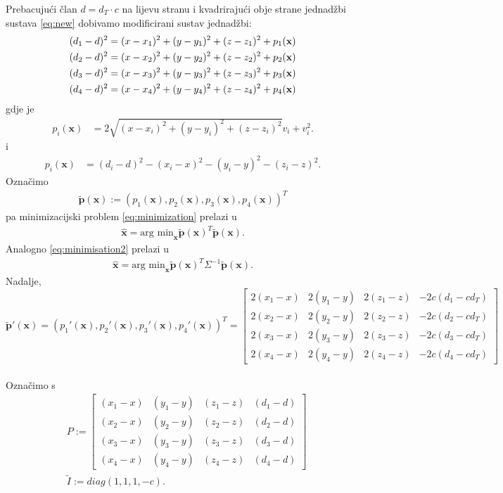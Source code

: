 \documentclass[a4paper,twoside,12pt]{memoir} %
\begin{document}
Prebacujući član $d=d_T \cdot c$ na lijevu stranu i kvadrirajući obje strane
jednadžbi sustava \ref{eq:new} dobivamo modificirani sustav jednadžbi:
\begin{align}\label{eq:newIzvedba}
(d_1-d)^2 = (x-x_1)^{2}+(y-y_1)^{2}+(z-z_1)^{2} + p_1(\textbf{x})\notag \\
(d_2-d)^2 = (x-x_2)^{2}+(y-y_2)^{2}+(z-z_2)^{2} + p_2(\textbf{x})\\
(d_3-d)^2 = (x-x_3)^{2}+(y-y_3)^{2}+(z-z_3)^{2} + p_3(\textbf{x})\notag \\
(d_4-d)^2 = (x-x_4)^{2}+(y-y_4)^{2}+(z-z_4)^{2} + p_4(\textbf{x})\notag
\end{align}
gdje je 
\begin{align*}
p_i(\textbf{x}) & = 2\sqrt{(x-x_i)^{2}+(y-y_i)^{2}+(z-z_i)^{2}}v_i + v_i^2.
\end{align*} i
\begin{align*}
p_i(\textbf{x}) & = (d_i-d)^2 - (x_i-x)^{2} - (y_i-y)^{2} - (z_i-z)^{2}.
\end{align*}
Označimo 
\begin{align*} \mathbf{\tilde{p}}(\mathbf{x}) := (p_1(\textbf{x}),p_2(\textbf{x}),p_3(\textbf{x}),p_4(\textbf{x}))^T
\end{align*}
pa minimizacijski problem \ref{eq:minimization} prelazi u
\begin{align}\label{eq:minimisation3}
\hat{\mathbf{x}} = \text{arg min}_\mathbf{x} \mathbf{\tilde{p}}(\mathbf{x})^T\mathbf{\tilde{p}}(\mathbf{x}).
\end{align}
Analogno \ref{eq:minimisation2} prelazi u 
\begin{align}\label{eq:minimisation4}
\hat{\mathbf{x}} = \text{arg min}_\mathbf{x} \mathbf{\tilde{p}}(\mathbf{x})^T \Sigma ^{-1}\mathbf{\tilde{p}}(\mathbf{x}).
\end{align}
\vspace{0.5cm}
Nadalje, $$ \mathbf{\tilde{p}'}(\mathbf{x}) = (p_1'(\textbf{x}),p_2'(\textbf{x}),p_3'(\textbf{x}),p_4'(\textbf{x}))^T 
= \begin{bmatrix}
2(x_1-x) &  2(y_1-y) &  2(z_1-z) & - 2c(d_1-cd_T)\\
2(x_2-x) &  2(y_2-y) &  2(z_2-z) & - 2c(d_2-cd_T) \\
2(x_3-x) &  2(y_3-y) &  2(z_3-z) & - 2c(d_3-cd_T) \\
2(x_4-x) &  2(y_4-y) &  2(z_4-z) & - 2c(d_4-cd_T) 
\end{bmatrix}
$$
\\Označimo s 
\begin{align*}
& P := \begin{bmatrix}
(x_1-x) & (y_1-y) & (z_1-z) & (d_1-d) \\
(x_2-x) & (y_2-y) & (z_2-z) & (d_2-d) \\
(x_3-x) & (y_3-y) & (z_3-z) & (d_3-d) \\
(x_4-x) & (y_4-y) & (z_4-z) & (d_4-d) 
\end{bmatrix} \\
& \tilde{I} := diag(1,1,1,-c).
\end{align*}
\end{document}

